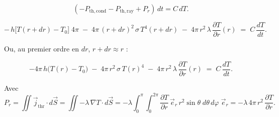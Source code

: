 \documentclass[a4paper,12pt]{article}
\begin{document}
\[
(-P_{\mathrm{th,cond}} - P_{\mathrm{th,ray}} + P_r)\,dt = C\,dT.
\]

\[
-\,h\bigl[T(r+dr)-T_0\bigr]\;4\pi
\;-\;4\pi\,(r+dr)^2\,\sigma\,T^4(r+dr)
\;-\;4\pi\,r^2\,\lambda\,\frac{\partial T}{\partial r}(r)
\;=\;C\,\frac{dT}{dt}.
\]

\medskip

Ou, au premier ordre en \(dr\), \(r+dr\approx r\) :

\[
-4\pi\,h\bigl(T(r)-T_0\bigr)
\;-\;4\pi\,r^2\,\sigma\,T(r)^4
\;-\;4\pi\,r^2\,\lambda\,\frac{\partial T}{\partial r}(r)
\;=\;C\,\frac{dT}{dt}.
\]

\medskip

Avec
\[
P_{r}
= \iint\vec j_{\mathrm{thr}}\cdot d\vec S
= \iint -\lambda\,\nabla T\cdot d\vec S
= -\lambda
  \int_{0}^{\pi}\!\!\int_{0}^{2\pi}
    \frac{\partial T}{\partial r}\,\vec e_{r}\,
    r^2\sin\theta\;d\theta\,d\varphi\;\vec e_{r}
= -\lambda\,4\pi\,r^2\,\frac{\partial T}{\partial r}.
\]


 
\vspace{1cm}
\end{document}
